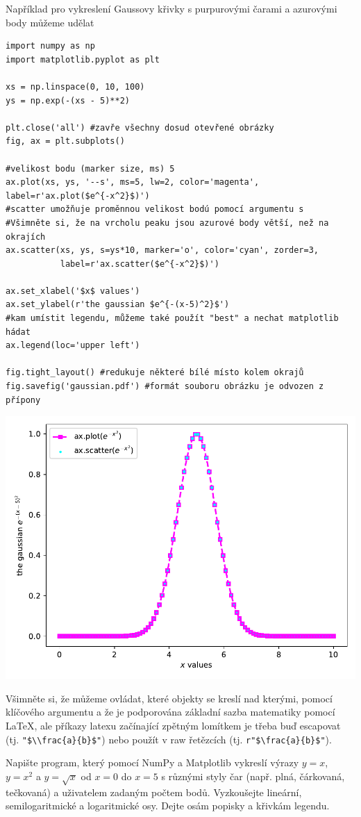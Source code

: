 Například pro vykreslení Gaussovy křivky s purpurovými čarami a azurovými body můžeme udělat
\begin{lstlisting}[caption=Kompletní příklad vykreslování.]
import numpy as np
import matplotlib.pyplot as plt

xs = np.linspace(0, 10, 100)
ys = np.exp(-(xs - 5)**2)

plt.close('all') #zavře všechny dosud otevřené obrázky
fig, ax = plt.subplots()

#velikost bodu (marker size, ms) 5
ax.plot(xs, ys, '--s', ms=5, lw=2, color='magenta', label=r'ax.plot($e^{-x^2}$)')
#scatter umožňuje proměnnou velikost bodú pomocí argumentu s
#Všimněte si, že na vrcholu peaku jsou azurové body větší, než na okrajích
ax.scatter(xs, ys, s=ys*10, marker='o', color='cyan', zorder=3,
           label=r'ax.scatter($e^{-x^2}$)')

ax.set_xlabel('$x$ values')
ax.set_ylabel(r'the gaussian $e^{-(x-5)^2}$')
#kam umístit legendu, můžeme také použít "best" a nechat matplotlib hádat
ax.legend(loc='upper left')

fig.tight_layout() #redukuje některé bílé místo kolem okrajů
fig.savefig('gaussian.pdf') #formát souboru obrázku je odvozen z přípony
\end{lstlisting}
\begin{center}
    \includegraphics[width=0.5\linewidth]{gaussian.pdf}
\end{center}
Všimněte si, že můžeme ovládat, které objekty se kreslí nad kterými, pomocí klíčového argumentu  a že je podporována základní sazba matematiky pomocí \LaTeX, ale příkazy latexu začínající zpětným lomítkem je třeba buď escapovat (tj. \verb|"$\\frac{a}{b}$"|) nebo použít v raw řetězcích (tj. \verb|r"$\frac{a}{b}$"|).

\begin{exercise}
    Napište program, který pomocí NumPy a Matplotlib vykreslí výrazy $y=x$, $y=x^2$ a $y=\sqrt{x}$ od $x=0$ do $x=5$ s různými styly čar (např. plná, čárkovaná, tečkovaná) a uživatelem zadaným počtem bodů. Vyzkoušejte lineární, semilogaritmické a logaritmické osy. Dejte osám popisky a křivkám legendu.
\end{exercise}

